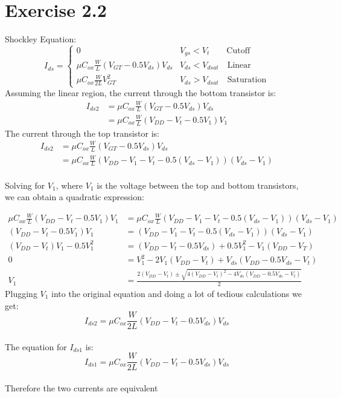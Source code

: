 \documentclass[11pt]{article}
\begin{document}
\section{Exercise 2.2}
Shockley Equation: 
\begin{equation*}
I_{ds} = \begin{cases}


	 0   &V_{gs} < V_t \quad \quad \textrm{Cutoff}\\
	 \mu C_{ox} \frac{W}{L}(V_{GT} - 0.5V_{ds})V_{ds} & V_{ds} < V_{dsat} \quad \textrm{Linear} \\
	 \mu C_{ox} \frac{W}{2L}V_{GT}^2 & V_{ds} > V_{dsat} \quad \textrm{Saturation}
\end{cases}
\end{equation*}
Assuming the linear region, the current through the bottom transistor is:
\begin{align*}
	I_{ds2} & = \mu C_{ox} \frac{W}{L}(V_{GT} - 0.5V_{ds})V_{ds}\\
	& = \mu C_{ox} \frac{W}{L}(V_{DD} - V_t - 0.5V_{1})V_{1}
\end{align*}
The current through the top transistor is:
\begin{align*}
	I_{ds2} & = \mu C_{ox} \frac{W}{L}(V_{GT} - 0.5V_{ds})V_{ds}\\
	& = \mu C_{ox} \frac{W}{L}(V_{DD} - V_1 -V_t - 0.5(V_{ds} -V_{1}))(V_{ds} -V_{1})
\end{align*}
\\
Solving for $V_1$, where $V_1$ is the voltage between the top and bottom transistors, we can obtain a quadratic expression:

\begin{align*}
		\mu C_{ox} \frac{W}{L}(V_{DD} - V_t - 0.5V_{1})V_{1} &= \mu C_{ox} \frac{W}{L}(V_{DD} - V_1 - V_t - 0.5(V_{ds} -V_{1}))(V_{ds} -V_{1})\\
		(V_{DD} - V_t - 0.5V_{1})V_{1} &= (V_{DD} - V_1 -V_t - 0.5(V_{ds} -V_{1}))(V_{ds} -V_{1})\\
		(V_{DD}-V_t)V_1-0.5V_1^2 &= (V_{DD}-V_t -0.5V_{ds})+0.5V_1^2-V_1(V_{DD}- V_T)\\
		0 &= V_1^2 - 2V_1(V_{DD} - V_t)+ V_{ds}(V_{DD}-0.5V_{ds} -V_t)\\
		V_1&= \frac{2(V_{DD}-V_t)\pm \sqrt{4(V_{DD}-V_t)^2-4V_{ds}(V_{DD}-0.5V_{ds}-V_t)}}{2}	
\end{align*}
	Plugging $V_1$ into the original equation and doing a lot of tedious calculations we get:
	$$I_{ds2} =  \mu C_{ox} \frac{W}{2L}(V_{DD}-V_t-0.5V_{ds})V_{ds}$$
~\\	
	The equation for $I_{ds1}$ is:
	$$I_{ds1} =  \mu C_{ox} \frac{W}{2L}(V_{DD}-V_t-0.5V_{ds})V_{ds}$$
~\\	
Therefore the two currents are equivalent
\end{document}
